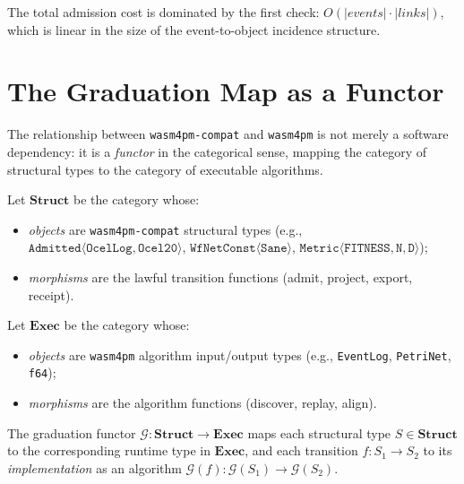 The total admission cost is dominated by the first check:
$O(|\mathit{events}| \cdot |\mathit{links}|)$, which is linear in the size
of the event-to-object incidence structure.

\section{The Graduation Map as a Functor}
\label{sec:conc-functor}

The relationship between \texttt{wasm4pm-compat} and \texttt{wasm4pm} is
not merely a software dependency: it is a \emph{functor} in the categorical
sense, mapping the category of structural types to the category of executable
algorithms.

\begin{definition}
Let $\mathbf{Struct}$ be the category whose:
\begin{itemize}
  \item \emph{objects} are \texttt{wasm4pm-compat} structural types
    (e.g., $\mathtt{Admitted\langle OcelLog, Ocel20\rangle}$,
    $\mathtt{WfNetConst\langle Sane\rangle}$,
    $\mathtt{Metric\langle FITNESS, N, D\rangle}$);
  \item \emph{morphisms} are the lawful transition functions (admit, project,
    export, receipt).
\end{itemize}
\end{definition}

\begin{definition}
Let $\mathbf{Exec}$ be the category whose:
\begin{itemize}
  \item \emph{objects} are \texttt{wasm4pm} algorithm input/output types
    (e.g., \texttt{EventLog}, \texttt{PetriNet}, \texttt{f64});
  \item \emph{morphisms} are the algorithm functions (discover, replay,
    align).
\end{itemize}
\end{definition}

\begin{definition}
The graduation functor $\mathcal{G} : \mathbf{Struct} \to \mathbf{Exec}$
maps each structural type $S \in \mathbf{Struct}$ to the corresponding runtime
type in $\mathbf{Exec}$, and each transition $f : S_1 \to S_2$ to its
\emph{implementation} as an algorithm $\mathcal{G}(f) : \mathcal{G}(S_1) \to
\mathcal{G}(S_2)$.
\end{definition}

